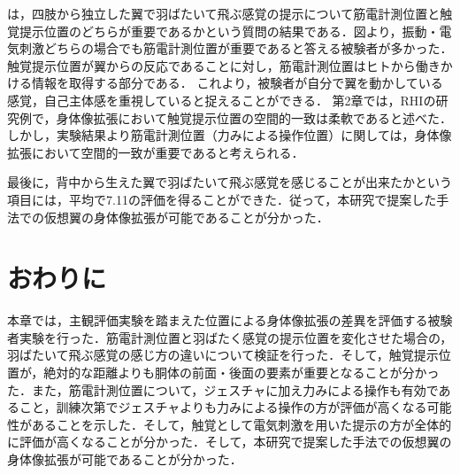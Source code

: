         は，四肢から独立した翼で羽ばたいて飛ぶ感覚の提示について筋電計測位置と触覚提示位置のどちらが重要であるかという質問の結果である．図より，振動・電気刺激どちらの場合でも筋電計測位置が重要であると答える被験者が多かった．
        触覚提示位置が翼からの反応であることに対し，筋電計測位置はヒトから働きかける情報を取得する部分である．
        これより，被験者が自分で翼を動かしている感覚，自己主体感を重視していると捉えることができる．
        第2章では，RHIの研究例\cite{armel2003projecting}で，身体像拡張において触覚提示位置の空間的一致は柔軟であると述べた．しかし，実験結果より筋電計測位置（力みによる操作位置）に関しては，身体像拡張において空間的一致が重要であると考えられる．


        最後に，背中から生えた翼で羽ばたいて飛ぶ感覚を感じることが出来たかという項目には，平均で7.11の評価を得ることができた．従って，本研究で提案した手法での仮想翼の身体像拡張が可能であることが分かった．


\section{おわりに}
        本章では，主観評価実験を踏まえた位置による身体像拡張の差異を評価する被験者実験を行った．筋電計測位置と羽ばたく感覚の提示位置を変化させた場合の，羽ばたいて飛ぶ感覚の感じ方の違いについて検証を行った．そして，触覚提示位置が，絶対的な距離よりも胴体の前面・後面の要素が重要となることが分かった．また，筋電計測位置について，ジェスチャに加え力みによる操作も有効であること，訓練次第でジェスチャよりも力みによる操作の方が評価が高くなる可能性があることを示した．そして，触覚として電気刺激を用いた提示の方が全体的に評価が高くなることが分かった．そして，本研究で提案した手法での仮想翼の身体像拡張が可能であることが分かった．

